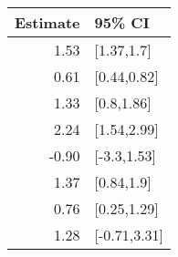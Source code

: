 \begin{tabular}{rl}
  \hline
Estimate & 95\% CI \\ 
  \hline
1.53 & [1.37,1.7] \\ 
  0.61 & [0.44,0.82] \\ 
  1.33 & [0.8,1.86] \\ 
  2.24 & [1.54,2.99] \\ 
  -0.90 & [-3.3,1.53] \\ 
  1.37 & [0.84,1.9] \\ 
  0.76 & [0.25,1.29] \\ 
  1.28 & [-0.71,3.31] \\ 
   \hline
\end{tabular}

